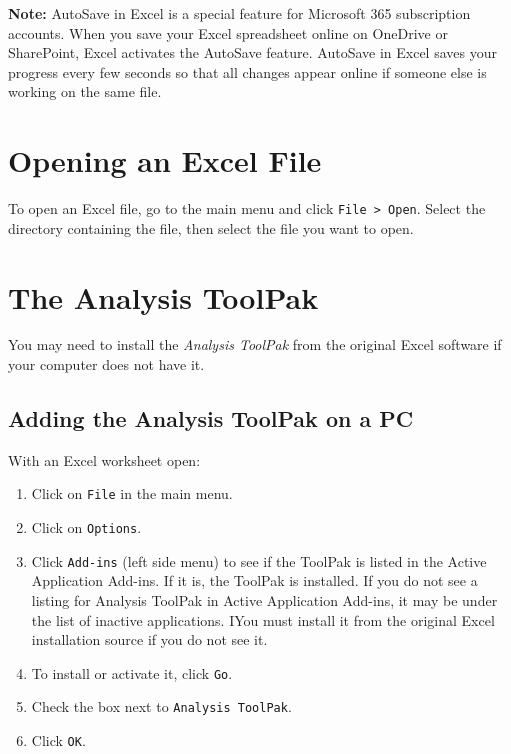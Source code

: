 \documentclass[
]{book}
\providecommand{\tightlist}{%
  \setlength{\itemsep}{0pt}\setlength{\parskip}{0pt}}
\begin{document}
\textbf{Note:} AutoSave in Excel is a special feature for Microsoft 365 subscription accounts. When you save your Excel spreadsheet online on OneDrive or SharePoint, Excel activates the AutoSave feature. AutoSave in Excel saves your progress every few seconds so that all changes appear online if someone else is working on the same file.

\hypertarget{opening-an-excel-file}{%
\section{Opening an Excel File}\label{opening-an-excel-file}}

To open an Excel file, go to the main menu and click \texttt{File\ \textgreater{}\ Open}. Select the directory containing the file, then select the file you want to open.

\hypertarget{toolpak}{%
\section{The Analysis ToolPak}\label{toolpak}}

You may need to install the \emph{Analysis ToolPak} from the original Excel software if your computer does not have it.

\hypertarget{adding-the-analysis-toolpak-on-a-pc}{%
\subsection{Adding the Analysis ToolPak on a PC}\label{adding-the-analysis-toolpak-on-a-pc}}

With an Excel worksheet open:

\begin{enumerate}
\def\labelenumi{\arabic{enumi}.}
\tightlist
\item
  Click on \texttt{File} in the main menu.
\item
  Click on \texttt{Options}.
\item
  Click \texttt{Add-ins} (left side menu) to see if the ToolPak is listed in the Active Application Add-ins. If it is, the ToolPak is installed. If you do not see a listing for Analysis ToolPak in Active Application Add-ins, it may be under the list of inactive applications. IYou must install it from the original Excel installation source if you do not see it.
\item
  To install or activate it, click \texttt{Go}.
\item
  Check the box next to \texttt{Analysis\ ToolPak}.
\item
  Click \texttt{OK}.
\end{enumerate}
\end{document}

